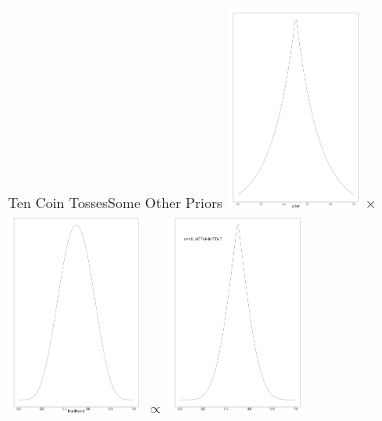 \documentclass[dvipsnames,mathserif, handout]{beamer}
\begin{document}
{\begin{frame}{Ten Coin Tosses}{Some Other Priors}
		\includegraphics[valign=m, width=100pt]{cointosses/peaked_prior.pdf} $\times$
	    	\includegraphics[valign=m, width=100pt]{cointosses/Ten_pre.pdf} $\propto$
	    	\includegraphics[valign=m, width=100pt]{cointosses/peaked_Ten.pdf}
\end{frame}

}
\end{document}

